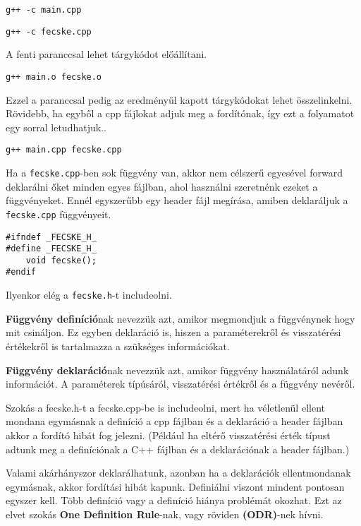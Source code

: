 \documentclass[a4paper,11.5pt,table]{article}
\begin{document}
    {\centering\texttt{g++ -c main.cpp}\par}

	{\centering\texttt{g++ -c fecske.cpp}\par}

	A fenti paranccsal lehet tárgykódot előállítani.
	
	{\centering\texttt{g++ main.o fecske.o}\par}
	
	Ezzel a paranccsal pedig az eredményül kapott tárgykódokat lehet összelinkelni. Rövidebb, ha egyből a cpp fájlokat adjuk meg a fordítónak, így ezt a folyamatot egy sorral letudhatjuk..

	{\centering\texttt{g++ main.cpp fecske.cpp} \par}
	
	Ha a \texttt{fecske.cpp}-ben sok függvény van, akkor nem célszerű egyesével forward deklarálni őket minden egyes fájlban, ahol használni szeretnénk ezeket a függvényeket. Ennél egyszerűbb egy header fájl megírása, amiben deklaráljuk a \texttt{fecske.cpp} függvényeit.
	\bigskip
	
	\begin{lstlisting}
#ifndef _FECSKE_H_
#define _FECSKE_H_
	void fecske();
#endif
	\end{lstlisting}
	Ilyenkor elég a \texttt{fecske.h}-t includeolni.
	\medskip
	
	\textbf{Függvény definíció}nak nevezzük azt, amikor megmondjuk a függvénynek hogy mit csináljon. Ez egyben deklaráció is, hiszen a paraméterekről és visszatérési értékekről is tartalmazza a szükséges információkat.
	\medskip
	
	\textbf{Függvény deklaráció}nak nevezzük azt, amikor függvény használatáról adunk információt. A paraméterek típúsáról, visszatérési értékről és a függvény nevéről.
	\medskip
	
  Szokás a fecske.h-t a fecske.cpp-be is includeolni, mert ha véletlenül ellent mondana egymásnak a definíció a cpp fájlban és a deklaráció a header fájlban akkor a fordító hibát fog jelezni. (Például ha eltérő visszatérési érték típust adtunk meg a definíciónak a C++ fájlban és a deklarációnak a header fájlban.)
	
	Valami akárhányszor deklarálhatunk, azonban ha a deklarációk ellentmondanak egymásnak, akkor fordítási hibát kapunk. Definiálni viszont mindent pontosan egyszer kell. Több definíció vagy a definíció hiánya problémát okozhat. Ezt az elvet szokás \textbf{One Definition Rule}-nak, vagy röviden \textbf{(ODR)}-nek hívni.
	\bigskip
	
\end{document}
